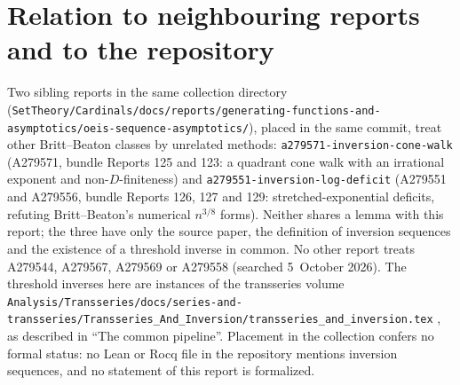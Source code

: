 \documentclass[11pt,letterpaper]{article}
\theoremstyle{remark}\newtheorem{remark}[theorem]{Remark}
\newcommand{\file}[1]{\nolinkurl{#1}}
\begin{document}
\section*{Relation to neighbouring reports and to the repository}\label{ivk:sec:neighbours}
Two sibling reports in the same collection directory (\file{SetTheory/Cardinals/docs/reports/generating-functions-and-asymptotics/}\allowbreak\file{oeis-sequence-asymptotics/}), placed in the same commit, treat other Britt--Beaton classes by unrelated methods: \file{a279571-inversion-cone-walk} (A279571, bundle Reports 125 and 123: a quadrant cone walk with an irrational exponent and non-$D$-finiteness) and \file{a279551-inversion-log-deficit} (A279551 and A279556, bundle Reports 126, 127 and 129: stretched-exponential deficits, refuting Britt--Beaton's numerical $n^{3/8}$ forms). Neither shares a lemma with this report; the three have only the source paper, the definition of inversion sequences and the existence of a threshold inverse in common. No other report treats A279544, A279567, A279569 or A279558 (searched 5~October 2026). The threshold inverses here are instances of the transseries volume \file{Analysis/Transseries/docs/series-and-transseries/Transseries_And_Inversion/transseries_and_inversion.tex} \cite{tsvol}, as described in ``The common pipeline''. Placement in the collection confers no formal status: no Lean or Rocq file in the repository mentions inversion sequences, and no statement of this report is formalized.

\clearpage

\clearpage
\end{document}
